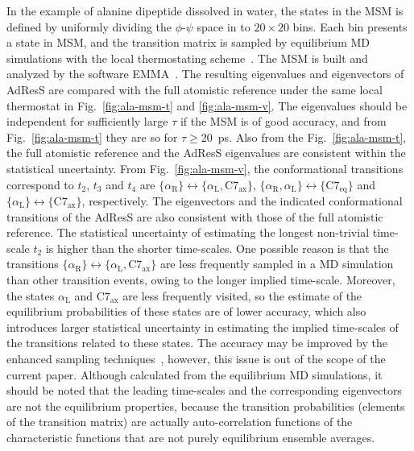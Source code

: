 \documentclass[epjST]{svjour}
\newcommand{\recheck}[1]{{\color{red} #1}}
\newcommand{\confa}[0]{{\alpha_{\textrm{R}}}}
\newcommand{\confb}[0]{{\textrm{C}7_{\textrm{eq}}}}
\newcommand{\confc}[0]{{\alpha_{\textrm{L}}}}
\newcommand{\confd}[0]{{\textrm{C}7_{\textrm{ax}}}}
\begin{document}
In the example of alanine dipeptide dissolved in water, the states in the MSM
is defined by uniformly dividing the $\phi$-$\psi$ space in to $20\times 20$ bins.
Each bin presents a state in MSM, and the transition matrix is sampled by equilibrium
MD simulations with the local thermostating scheme~\cite{wang2014exploring}.
The MSM is built and analyzed by the software EMMA~\cite{senne2012emma}.
The resulting eigenvalues and eigenvectors of AdResS are compared with the full atomistic reference under the same local thermostat in
Fig.~\ref{fig:ala-msm-t} and \ref{fig:ala-msm-v}. The
eigenvalues should be independent for sufficiently large $\tau$ if the MSM is of good
accuracy, and from Fig.~\ref{fig:ala-msm-t} they are so for $\tau \geq 20$~ps.
Also from the Fig.~\ref{fig:ala-msm-t}, the full atomistic
reference and the AdResS eigenvalues are consistent within the statistical
uncertainty.
From Fig.~\ref{fig:ala-msm-v}, the conformational transitions correspond
to $t_2$, $t_3$ and $t_4$ are $\{\confa \} \leftrightarrow \{\confc,\confd\}$,
$\{\confa, \confc \} \leftrightarrow \{\confb\}$ and $\{\confc \} \leftrightarrow \{\confd\}$, respectively.
The eigenvectors and the indicated conformational transitions of the AdResS are also consistent with
those of the full atomistic reference.
\recheck{
  The statistical uncertainty of estimating the longest non-trivial time-scale $t_2$ is higher than
  the shorter time-scales. One possible reason is that
  the transitions $\{\confa \} \leftrightarrow \{\confc,\confd\}$ are less frequently sampled in
  a MD simulation than other transition events, owing to the longer implied time-scale. Moreover, the
  states $\confc$ and $\confd$ are less frequently visited, so the estimate of the  equilibrium probabilities of these
  states are of lower accuracy, which also introduces larger statistical uncertainty
  in estimating the implied time-scales of the transitions related to these states.
  The accuracy may be improved by the enhanced sampling techniques~\cite{rosta2014free}, however, this
  issue is out of the scope of the current paper.}
Although calculated from the
equilibrium MD simulations, it should be noted that the leading time-scales and the
corresponding eigenvectors are not the equilibrium properties, because
the transition probabilities (elements of the transition matrix) are actually
auto-correlation functions of the characteristic functions that are not \recheck{purely} equilibrium ensemble averages.

\end{document}
